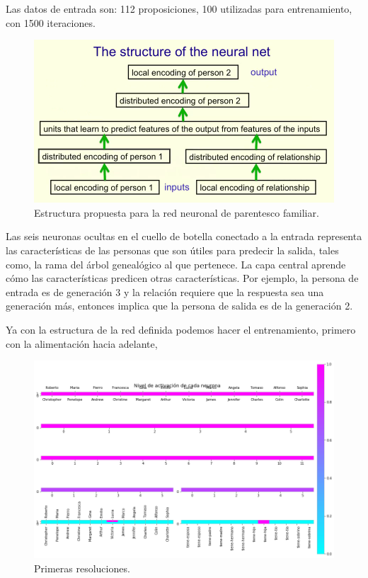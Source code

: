 Las datos de entrada son: 112 proposiciones, 100 utilizadas para entrenamiento, con 1500 iteraciones.

  \begin{figure}[h]
   \centering
   \includegraphics[scale=.5]{../Figuras/Hinton/RedHinton86.png}
   \caption{Estructura propuesta para la red neuronal de parentesco familiar.}
  \label{fig:RH86}
  \end{figure}

Las seis neuronas ocultas en el cuello de botella conectado a la entrada representa las características de las personas que
son útiles para predecir la salida, tales como, la rama del árbol genealógico al que pertenece.
La capa central aprende cómo las características predicen
otras características. Por ejemplo, la persona de entrada es de generación 3 y la relación requiere que la respuesta sea una generación más, entonces implica que la persona de salida es de la generación 2.

Ya con la estructura de la red definida podemos hacer el entrenamiento, primero con la alimentación hacia adelante, 

  \begin{figure}[h]
   \centering
   \includegraphics[scale=.5]{../Figuras/Hinton/r1.png}
   \caption{Primeras resoluciones.}
  \label{fig:r1}
  \end{figure}

